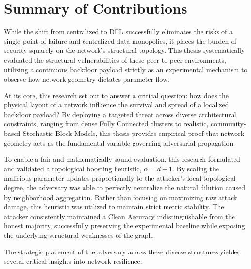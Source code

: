 \section{Summary of Contributions}
While the shift from centralized to DFL successfully eliminates the risks of a single point of failure and centralized data monopolies, it places the burden of security squarely on the network's structural topology. This thesis systematically evaluated the structural vulnerabilities of these peer-to-peer environments, utilizing a continuous backdoor payload strictly as an experimental mechanism to observe how network geometry dictates parameter flow.

At its core, this research set out to answer a critical question: how does the physical layout of a network influence the survival and spread of a localized backdoor payload? By deploying a targeted threat across diverse architectural constraints, ranging from dense Fully Connected clusters to realistic, community-based Stochastic Block Models, this thesis provides empirical proof that network geometry acts as the fundamental variable governing adversarial propagation. 

To enable a fair and mathematically sound evaluation, this research formulated and validated a topological boosting heuristic, $\alpha=d+1$. By scaling the malicious parameter updates proportionally to the attacker's local topological degree, the adversary was able to perfectly neutralize the natural dilution caused by neighborhood aggregation. Rather than focusing on maximizing raw attack damage, this heuristic was utilized to maintain strict metric stability. The attacker consistently maintained a Clean Accuracy indistinguishable from the honest majority, successfully preserving the experimental baseline while exposing the underlying structural weaknesses of the graph. 

The strategic placement of the adversary across these diverse structures yielded several critical insights into network resilience:

